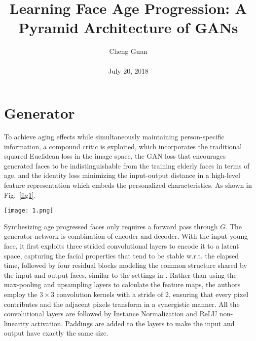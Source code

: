 \documentclass[10pt,twocolumn,letterpaper]{article}
\title{Learning Face Age Progression: A Pyramid Architecture of GANs}
\author{Cheng Guan\\\\
July 20, 2018}
\begin{document}
\maketitle
\section{Generator}
To achieve aging effects while
simultaneously maintaining person-specific information, a
compound critic is exploited, which incorporates the traditional squared Euclidean loss in the image space, the GAN
loss that encourages generated faces to be indistinguishable
from the training elderly faces in terms of age, and the identity loss minimizing the input-output distance in a high-level
feature representation which embeds the personalized characteristics. As shown in Fig.~\ref{fig1}.
%
\begin{figure*}[hb]
	\centering
  	\texttt{[image: 1.png]}
  	\caption{Framework of the proposed age progression method.}
  	\label{fig1}
\end{figure*}
%
\par
Synthesizing age progressed faces only requires a forward pass through $G$. The generator network is combination of encoder and decoder. With the input young face, it first exploits three strided 
convolutional layers to encode it to a latent space, capturing the facial properties that tend to
be stable w.r.t. the elapsed time, followed by four residual
blocks \cite{he2016deep} modeling the common structure shared by the
input and output faces, similar to the settings in \cite{johnson2016perceptual}.
Rather than using the max-pooling and upsampling
layers to calculate the feature maps, the authors employ the 
$3 \times 3$
convolution kernels with a stride of 2, ensuring that every
pixel contributes and the adjacent pixels transform in a 
synergistic manner. All the convolutional layers are followed
by Instance Normalization and ReLU non-linearity 
activation. Paddings are added to the layers to make the input and
output have exactly the same size. 
\end{document}
